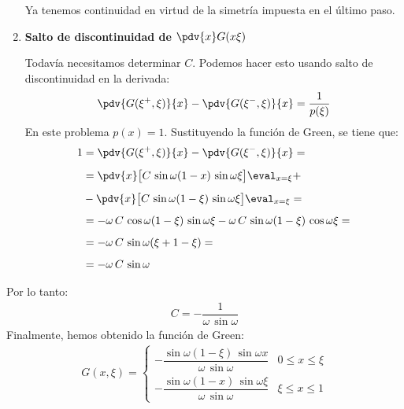 \begin{ejemplo}
\begin{enumerate}
\par
\noindent
Ya tenemos continuidad en virtud de la simetría impuesta en el último paso.
\item \textbf{Salto de discontinuidad de $\displaystyle \pdv{x} G (x \xi)$}
\par
\noindent
Todavía necesitamos determinar $C$. Podemos hacer esto usando salto de discontinuidad en la derivada:
\begin{align*}
\pdv{G (\xi^{+}, \xi)}{x} - \pdv{G (\xi^{-}, \xi)}{x} = \dfrac{1}{p (\xi)}
\end{align*}
En este problema $p (x) = 1$. Sustituyendo la función de Green, se tiene que:
\begin{align}
\begin{aligned}[b]
1 & = \pdv{G (\xi^{+}, \xi)}{x} - \pdv{G (\xi^{-}, \xi)}{x} = \\[0.5em]
&= \pdv{x} \big[ C \, \sin \omega (1 - x) \, \sin \omega \xi \big] \eval_{x = \xi} + \\[0.5em]
&- \pdv{x} \big[ C \, \sin \omega (1 - \xi) \, \sin \omega \xi \big] \eval_{x = \xi} = \\[0.5em]
&= - \omega \, C \, \cos \omega (1 - \xi) \, \sin \omega \xi - \omega \, C \, \sin \omega (1 - \xi) \, \cos \omega  \xi = \\[0.5em]
&= - \omega \, C \, \sin \omega (\xi + 1 - \xi) = \\[0.5em]
&= - \omega \, C \, \sin \omega
\end{aligned}
\label{eq:ecuacion_07_39}
\end{align}
\end{enumerate}
Por lo tanto:
\begin{align*}
C = - \dfrac{1}{\omega \, \sin \omega}
\end{align*}
Finalmente, hemos obtenido la función de Green:
\begin{align}
G (x, \xi) = \begin{cases}
- \dfrac{\sin \omega (1 - \xi) \, \sin \omega x}{\omega \, \sin \omega} & 0 \leq x \leq \xi \\[1em]
- \dfrac{\sin \omega (1 - x) \, \sin \omega \xi}{\omega \, \sin \omega} & \xi \leq x \leq 1
\end{cases}
\label{eq:ecuacion_07_40}
\end{align}
\end{ejemplo}
